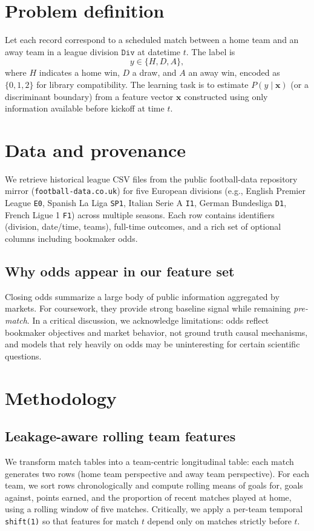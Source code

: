 \documentclass[11pt,a4paper]{article}
\begin{document}
\section{Problem definition}
Let each record correspond to a scheduled match between a home team and an away team in a league division \(\texttt{Div}\) at datetime \(t\). The label is
\[
y \in \{H, D, A\},
\]
where \(H\) indicates a home win, \(D\) a draw, and \(A\) an away win, encoded as \(\{0,1,2\}\) for library compatibility. The learning task is to estimate \(P(y\mid \mathbf{x})\) (or a discriminant boundary) from a feature vector \(\mathbf{x}\) constructed using only information available before kickoff at time \(t\).

\section{Data and provenance}
We retrieve historical league CSV files from the public football-data repository mirror (\texttt{football-data.co.uk}) for five European divisions (e.g., English Premier League \texttt{E0}, Spanish La Liga \texttt{SP1}, Italian Serie A \texttt{I1}, German Bundesliga \texttt{D1}, French Ligue 1 \texttt{F1}) across multiple seasons. Each row contains identifiers (division, date/time, teams), full-time outcomes, and a rich set of optional columns including bookmaker odds.

\subsection{Why odds appear in our feature set}
Closing odds summarize a large body of public information aggregated by markets. For coursework, they provide strong baseline signal while remaining \emph{pre-match}. In a critical discussion, we acknowledge limitations: odds reflect bookmaker objectives and market behavior, not ground truth causal mechanisms, and models that rely heavily on odds may be uninteresting for certain scientific questions.

\section{Methodology}
\subsection{Leakage-aware rolling team features}
We transform match tables into a team-centric longitudinal table: each match generates two rows (home team perspective and away team perspective). For each team, we sort rows chronologically and compute rolling means of goals for, goals against, points earned, and the proportion of recent matches played at home, using a rolling window of five matches. Critically, we apply a per-team temporal \texttt{shift(1)} so that features for match \(t\) depend only on matches strictly before \(t\).
\end{document}
